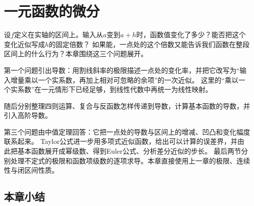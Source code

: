 \chapter{一元函数的微分}
\label{chap:univariate-differentiation}
\label{chap:continuous-functions}

设$f$定义在实轴的区间上。输入从$a$变到$a+h$时，函数值变化了多少？能否把这个变化近似写成$h$的固定倍数？
如果能，一点处的这个倍数又能告诉我们函数在整段区间上的什么行为？本章围绕这三个问题展开。

第一个问题引出导数：用割线斜率的极限描述一点处的变化率，并把它改写为“输入增量乘以一个实系数，再加上相对可忽略的余项”的一次近似。
这里的“乘以一个实系数”在一元情形下已经足够，到线性代数中再统一为线性映射。

随后分别整理四则运算、复合与反函数怎样传递到导数，计算基本函数的导数，并引入高阶导数。

第三个问题由中值定理回答：它把一点处的导数与区间上的增减、凹凸和变化幅度联系起来。
Taylor公式进一步用多项式近似函数，给出可以计算的误差界，并由此把基本函数展开成幂级数、得到Euler公式、分析差分近似的步长。
最后两节分别处理不定式的极限和函数项级数的逐项求导。本章直接使用上一章的极限、连续性与闭区间性质。










\FloatBarrier
\section{本章小结}
\label{sec:analysis-summary}

